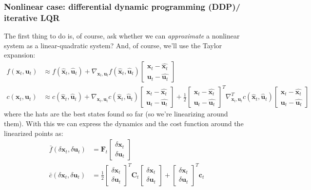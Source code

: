 \documentclass{report}
\begin{document}
\subsubsection{Nonlinear case: differential dynamic programming (DDP)/ iterative LQR}
The first thing to do is, of course,
ask whether we can \textit{approximate} a nonlinear system as a linear-quadratic system?
And, of course, we'll use the Taylor expansion:
\begin{align}
f (\bm{x}_{t}, \bm{u}_{t} ) &\approx f (\hat{\bm{x}}_{t}, \hat{\bm{u}}_{t} ) + 
\nabla_{ \bm{x}_{t}, \bm{u}_{t} } f (\hat{\bm{x}}_{t}, \hat{\bm{u}}_{t} ) 
\begin{bmatrix} \bm{x}_{t} - \hat{\bm{x}_{t}}\\ \bm{u}_{t} - \hat{\bm{u}_{t}} \end{bmatrix} \\
c (\bm{x}_{t}, \bm{u}_{t} ) &\approx
c (\hat{\bm{x}}_{t}, \hat{\bm{u}}_{t} ) + \nabla_{ \bm{x}_{t}, \bm{u}_{t} } c (\hat{\bm{x}}_{t}, \hat{\bm{u}}_{t} )
\begin{bmatrix} \bm{x}_{t} - \hat{\bm{x}_{t}}\\ \bm{u}_{t} - \hat{\bm{u}_{t}} \end{bmatrix}
+ \frac{1}{2} \begin{bmatrix} \bm{x}_{t} - \hat{\bm{x}_{t}}\\ \bm{u}_{t} - \hat{\bm{u}_{t}} \end{bmatrix}^{ T }
\nabla_{ \bm{x}_{t}, \bm{u}_{t} }^{ T } c (\hat{\bm{x}}_{t}, \hat{\bm{u}}_{t} ) \begin{bmatrix} \bm{x}_{t} - \hat{\bm{x}_{t}}\\ \bm{u}_{t} - \hat{\bm{u}_{t}} \end{bmatrix}
\end{align}
where the hats are the best states found so far (so we're linearizing around them).
With this we can express the dynamics and the cost function around
the linearized points as:
\begin{align}
\bar{f} (\delta\bm{x}_{t}, \delta\bm{u}_{t} ) &= \bm{F}_{t} \begin{bmatrix} \delta\bm{x}_{t} \\ \delta\bm{u}_{t} \end{bmatrix} \\
\bar{c} (\delta\bm{x}_{t}, \delta\bm{u}_{t} ) &=
\frac{1}{2} \begin{bmatrix} \delta\bm{x}_{t} \\ \delta\bm{u}_{t} \end{bmatrix}^{ T }
\bm{C}_{t} \begin{bmatrix} \delta\bm{x}_{t} \\ \delta\bm{u}_{t} \end{bmatrix} +
\begin{bmatrix} \delta\bm{x}_{t} \\ \delta\bm{u}_{t} \end{bmatrix}^{ T } \bm{c}_{t}
\end{align}
\end{document}
